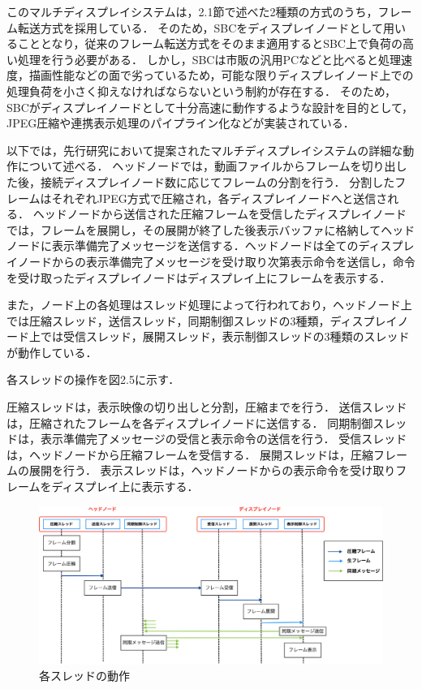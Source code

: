このマルチディスプレイシステムは，2.1節で述べた2種類の方式のうち，フレーム転送方式を採用している．
そのため，SBCをディスプレイノードとして用いることとなり，従来のフレーム転送方式をそのまま適用するとSBC上で負荷の高い処理を行う必要がある．
しかし，SBCは市販の汎用PCなどと比べると処理速度，描画性能などの面で劣っているため，可能な限りディスプレイノード上での処理負荷を小さく抑えなければならないという制約が存在する．
そのため，SBCがディスプレイノードとして十分高速に動作するような設計を目的として，JPEG圧縮や連携表示処理のパイプライン化などが実装されている．

以下では，先行研究において提案されたマルチディスプレイシステムの詳細な動作について述べる．
ヘッドノードでは，動画ファイルからフレームを切り出した後，接続ディスプレイノード数に応じてフレームの分割を行う．
分割したフレームはそれぞれJPEG方式で圧縮され，各ディスプレイノードへと送信される．
ヘッドノードから送信された圧縮フレームを受信したディスプレイノードでは，フレームを展開し，その展開が終了した後表示バッファに格納してヘッドノードに表示準備完了メッセージを送信する．ヘッドノードは全てのディスプレイノードからの表示準備完了メッセージを受け取り次第表示命令を送信し，命令を受け取ったディスプレイノードはディスプレイ上にフレームを表示する．

また，ノード上の各処理はスレッド処理によって行われており，ヘッドノード上では圧縮スレッド，送信スレッド，同期制御スレッドの3種類，ディスプレイノード上では受信スレッド，展開スレッド，表示制御スレッドの3種類のスレッドが動作している．

各スレッドの操作を図2.5に示す．

圧縮スレッドは，表示映像の切り出しと分割，圧縮までを行う．
送信スレッドは，圧縮されたフレームを各ディスプレイノードに送信する．
同期制御スレッドは，表示準備完了メッセージの受信と表示命令の送信を行う．
受信スレッドは，ヘッドノードから圧縮フレームを受信する．
展開スレッドは，圧縮フレームの展開を行う．
表示スレッドは，ヘッドノードからの表示命令を受け取りフレームをディスプレイ上に表示する．

\begin{center}
  \begin{figure}[H]
      \hspace*{\fill}
      \includegraphics[width=1.1\linewidth]{./fig/frow_system.eps}
      \hspace*{\fill}
      \caption{各スレッドの動作}
  \end{figure}
  \end{center}

